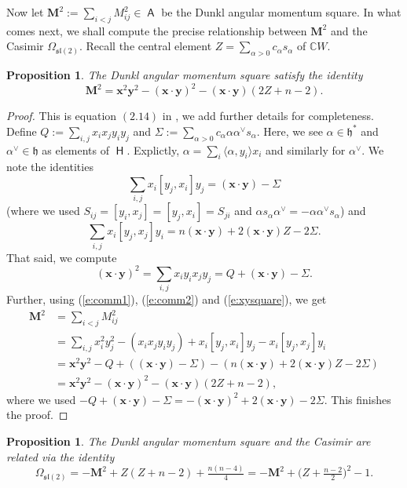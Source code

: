 \documentclass[pdftex]{sigma}
\numberwithin{equation}{section}
\newtheorem{Proposition}[Theorem]{Proposition}
 { \theoremstyle{definition}
\newtheorem{Definition}[Theorem]{Definition}
\newtheorem{Note}[Theorem]{Note}
\newtheorem{Example}[Theorem]{Example}
\newtheorem{Remark}[Theorem]{Remark} }
\newcommand{\fh}{\mathfrak{h}}
\newcommand{\fl}{\mathfrak{l}}
\newcommand{\fs}{\mathfrak{s}}
\newcommand{\bbc}{\mathbb{C}}
\newcommand{\bx}{\mathbf{x}}
\newcommand{\by}{\mathbf{y}}
\newcommand{\bM}{\mathbf{M}}
\DeclareMathOperator{\rca}{\mathsf{H}}
\DeclareMathOperator{\ama}{\mathsf{A}}
\begin{document}
Now let $\bM^2 := \sum_{i<j} M_{ij}^2\in\ama$ be the Dunkl angular momentum square. In what comes next, we shall compute the precise relationship between $\bM^2$ and the Casimir $\Omega_{\fs\fl(2)}$. Recall the central element $Z = \sum_{\alpha>0} c_\alpha s_\alpha$ of $\bbc W$.

\begin{Proposition}
The Dunkl angular momentum square satisfy the identity
\[
\bM^2 = \bx^2\by^2 - (\bx\cdot\by)^2 - (\bx\cdot\by)(2Z + n - 2).
\]
\end{Proposition}

\begin{proof} This is equation $(2.14)$ in \cite{FH15}, we add further details for completeness.
Define $Q := \sum_{i,j}x_ix_jy_iy_j$ and $\Sigma := \sum_{\alpha >0} c_\alpha\alpha\alpha^\vee s_\alpha$. Here, we see $\alpha\in\fh^*$ and $\alpha^\vee\in\fh$ as elements of $\rca$. Explictly, $\alpha = \sum_i \langle \alpha , y_i \rangle x_i$ and similarly for $\alpha^\vee$. We note the identities
\begin{equation}\label{e:comm1}
\sum_{i, j}x_i[y_j,x_i]y_j = (\bx\cdot\by) - \Sigma
\end{equation}
(where we used $S_{ij}=[y_i,x_j]=[y_j,x_i]=S_{ji}$ and $\alpha s_\alpha \alpha^\vee = -\alpha \alpha^\vee s_\alpha$) and
\begin{equation}\label{e:comm2}
\sum_{i, j}x_i[y_j,x_j]y_i
= n(\bx\cdot \by)+2(\bx\cdot\by)Z - 2\Sigma.
\end{equation}
That said, we compute
\begin{equation}\label{e:xysquare}
(\bx\cdot\by)^2 = \sum_{i,j} x_iy_ix_j y_j
= Q + (\bx\cdot\by) - \Sigma.
\end{equation}
Further,
using (\ref{e:comm1}), (\ref{e:comm2}) and (\ref{e:xysquare}), we get
\begin{align*}
\bM^2 &= \sum_{i<j} M_{ij}^2\\
&= \sum_{i,j} x_i^2y_j^2 - (x_ix_jy_iy_j) +x_i[y_j,x_i]y_j - x_i[y_j,x_j]y_i \\
&= \bx^2\by^2 -Q + ((\bx\cdot\by) - \Sigma) - (n(\bx\cdot\by)+2(\bx\cdot\by)Z - 2\Sigma)\\
&= \bx^2\by^2 - (\bx\cdot\by)^2 - (\bx\cdot\by)(2Z + n - 2),
\end{align*}
where we used $-Q + (\bx\cdot\by) - \Sigma = -(\bx\cdot\by)^2 + 2(\bx\cdot\by) - 2\Sigma$. This finishes the proof.
\end{proof}

\begin{Proposition}\label{p:CasM2}
The Dunkl angular momentum square and the Casimir are related via the identity
\[
\Omega_{\fs\fl(2)} = -\bM^2 + Z(Z + n - 2) + \tfrac{n(n-4)}{4} = -\bM^2 + \big(Z + \tfrac{n-2}{2}\big)^2 - 1.
\]
\end{Proposition}
\end{document}
